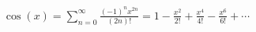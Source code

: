 \documentclass[preview]{standalone}
\begin{document}
\begin{align*}
\cos(x) = \sum_{n=0}^{\infty} \frac{(-1)^n x^{2n}}{(2n)!} = 1-\frac{x^2}{2!}+\frac{x^4}{4!}-\frac{x^6}{6!}+\cdots
\end{align*}
\end{document}
